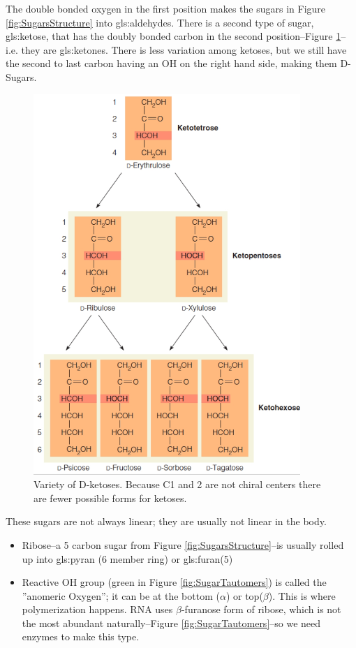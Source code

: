 \documentclass[]{article}
\begin{document}
The double bonded oxygen in the first position makes the sugars in Figure \ref{fig:SugarsStructure} into \glspl{gls:aldehyde}. There is a second type of sugar, \gls{gls:ketose}, that has the doubly bonded carbon in the second position--Figure \ref {fig:ketoses}--i.e. they are \glspl{gls:ketone}. There is less variation among ketoses, but we still have the second to last carbon having an OH on the right hand side, making them D-Sugars.
\begin{figure}[H]
	\caption[Variety of D-ketoses]{Variety of D-ketoses. Because C1 and 2 are not chiral centers there are fewer possible forms for ketoses.}\label{fig:ketoses} 
	\includegraphics[width=0.9\textwidth]{ketoses}
\end{figure}

These sugars are not always linear; they are usually not linear in the body.

\begin{itemize}
	\item Ribose--a 5 carbon sugar from Figure \ref{fig:SugarsStructure}--is usually rolled up into \gls{gls:pyran} (6 member ring) or \gls{gls:furan}(5)
	\item Reactive OH group (green in Figure \ref{fig:SugarTautomers}) is called the ''anomeric Oxygen''; it can be at the bottom ($\alpha$) or top($\beta$). This is where polymerization happens. RNA uses $\beta$-furanose form of ribose, which is not the most abundant naturally--Figure \ref{fig:SugarTautomers}--so we need enzymes to make this type.
\end{itemize}
\end{document}
